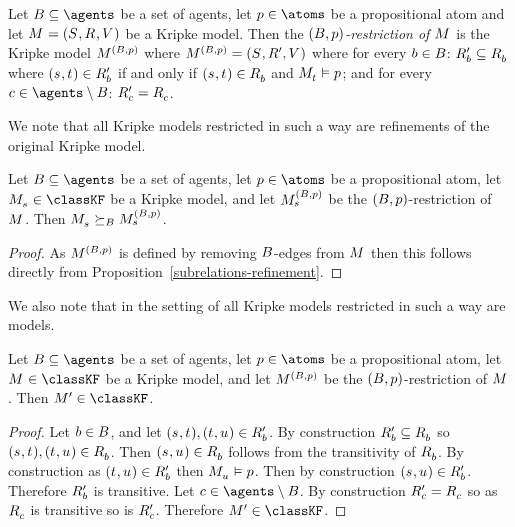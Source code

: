 \begin{definition}
Let $\agentsB \subseteq \agents$ be a set of agents, let $\atomP \in \atoms$ be a propositional atom and let $\kModelAndTuple$ be a Kripke model.
Then the {\em $(\agentsB, \atomP)$-restriction of $\kModel$} is the Kripke model $\kModel[(\agentsB, \atomP)]$ where $\kModel[(\agentsB, \atomP)] = (\kStates, \kAccessibilityP{}, \kValuation)$ where for every $\agentB \in \agentsB$: $\kAccessibilityPB \subseteq \kAccessibilityB$ where $(\kStateS, \kStateT) \in \kAccessibilityPB$ if and only if $(\kStateS, \kStateT) \in \kAccessibilityB$ and $\kPModel{\kStateT} \entails \atomP$; and for every $\agentC \in \agents \setminus \agentsB$: $\kAccessibilityPC = \kAccessibilityC$.
\end{definition}

We note that all Kripke models restricted in such a way are refinements of the original Kripke model.

\begin{lemma}\label{rml-k4-restriction-refinement}
Let $\agentsB \subseteq \agents$ be a set of agents, let $\atomP \in \atoms$ be a propositional atom, let $\kPModel{\kStateS} \in \classKF$ be a Kripke model, and let $\kPModel[(\agentsB, \atomP)]{\kStateS}$ be the $(\agentsB, \atomP)$-restriction of $\kModel$.
Then $\kPModel{\kStateS} \simulatesBs \kPModel[(\agentsB, \atomP)]{\kStateS}$.
\end{lemma}

\begin{proof}
As $\kModel[(\agentsB, \atomP)]$ is defined by removing $\agentsB$-edges from $\kModel$ then this follows directly from Proposition~\ref{subrelations-refinement}.
\end{proof}

We also note that in the setting of \classKF{} all Kripke models restricted in such a way are \classKF{} models.

\begin{lemma}\label{rml-k4-restriction-k4}
Let $\agentsB \subseteq \agents$ be a set of agents, let $\atomP \in \atoms$ be a propositional atom, let $\kModel \in \classKF$ be a Kripke model, and let $\kModel[(\agentsB, \atomP)]$ be the $(\agentsB, \atomP)$-restriction of $\kModel$.
Then $\kModelP \in \classKF$.
\end{lemma}

\begin{proof}
Let $\agentB \in \agentsB$, and let $(\kStateS, \kStateT), (\kStateT, \kStateU) \in \kAccessibilityPB$.
By construction $\kAccessibilityPB \subseteq \kAccessibilityB$ so $(\kStateS, \kStateT), (\kStateT, \kStateU) \in \kAccessibilityB$.
Then $(\kStateS, \kStateU) \in \kAccessibilityB$ follows from the transitivity of $\kAccessibilityB$.
By construction as $(\kStateT, \kStateU) \in \kAccessibilityPB$ then $\kPModel{\kStateU} \entails \atomP$.
Then by construction $(\kStateS, \kStateU) \in \kAccessibilityPB$.
Therefore $\kAccessibilityPB$ is transitive.
Let $\agentC \in \agents \setminus \agentsB$.
By construction $\kAccessibilityPC = \kAccessibilityC$ so as $\kAccessibilityC$ is transitive so is $\kAccessibilityPC$.
Therefore $\kModelP \in \classKF$.
\end{proof}

